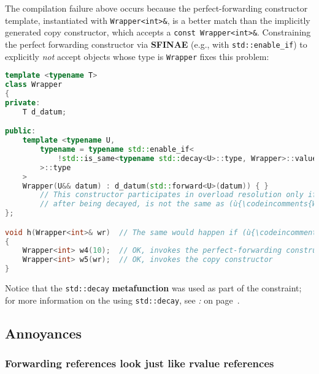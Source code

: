 \noindent The compilation failure above occurs because the perfect-forwarding
constructor template, instantiated with \texttt{Wrapper<int>\&}, is a
better match than the implicitly generated copy constructor, which
accepts a \texttt{const}~\texttt{Wrapper<int>\&}. Constraining the
perfect forwarding constructor via \textbf{SFINAE} (e.g., with
\texttt{std::enable\_if}) to explicitly \emph{not} accept objects whose
type is \texttt{Wrapper} fixes this problem:

\begin{lstlisting}[language=C++]
template <typename T>
class Wrapper
{
private:
    T d_datum;

public:
    template <typename U,
        typename = typename std::enable_if<
            !std::is_same<typename std::decay<U>::type, Wrapper>::value
        >::type
    >
    Wrapper(U&& datum) : d_datum(std::forward<U>(datum)) { }
        // This constructor participates in overload resolution only if (ù{\codeincomments{U}}ù),
        // after being decayed, is not the same as (ù{\codeincomments{Wrapper}}ù).
};

void h(Wrapper<int>& wr)  // The same would happen if (ù{\codeincomments{wr}}ù) were passed by value.
{
    Wrapper<int> w4(10);  // OK, invokes the perfect-forwarding constructor
    Wrapper<int> w5(wr);  // OK, invokes the copy constructor
}
\end{lstlisting}

\noindent Notice that the \texttt{std::decay} \textbf{metafunction} was used as
part of the constraint; for more information on the using
\texttt{std::decay}, see \textit{: } on page~\pageref{metafunctions-are-required-in-constraints}.

\subsection[Annoyances]{Annoyances}\label{annoyances-forwardingref}

\subsubsection[Forwarding references look just like rvalue references]{Forwarding references look just like rvalue references}\label{forwarding-references-look-just-like-rvalue-references}

